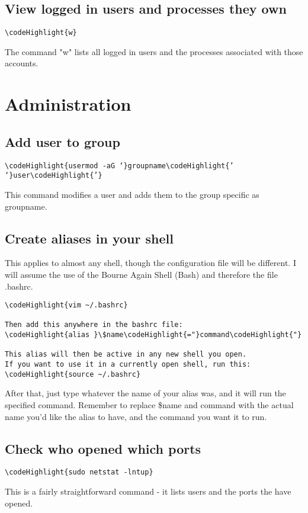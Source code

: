 \documentclass[12pt,a4paper]{article}
\begin{document}
\subsection{View logged in users and processes they own}
\begin{Verbatim}[commandchars=\\\{\}]
\codeHighlight{w}
\end{Verbatim}
The command "w" lists all logged in users and the processes associated with those accounts.

\section{Administration}
\label{Administration}

\subsection{Add user to group}
\begin{Verbatim}[commandchars=\\\{\}]
\codeHighlight{usermod -aG ‘}groupname\codeHighlight{’ ‘}user\codeHighlight{’}
\end{Verbatim}
This command modifies a user and adds them to the group specific as groupname.

\subsection{Create aliases in your shell}
\label{aliases}
This applies to almost any shell, though the configuration file will be different.  I will assume the use of the Bourne Again Shell (Bash) and therefore the file .bashrc.
\begin{Verbatim}[commandchars=\\\{\}]
\codeHighlight{vim ~/.bashrc}

Then add this anywhere in the bashrc file:
\codeHighlight{alias }\$name\codeHighlight{="}command\codeHighlight{"}

This alias will then be active in any new shell you open.
If you want to use it in a currently open shell, run this:
\codeHighlight{source ~/.bashrc}
\end{Verbatim}
After that, just type whatever the name of your alias was, and it will run the specified command.  Remember to replace \$name and command with the actual name you'd like the alias to have, and the command you want it to run.

\subsection{Check who opened which ports}
\begin{Verbatim}[commandchars=\\\{\}]
\codeHighlight{sudo netstat -lntup}
\end{Verbatim}
This is a fairly straightforward command - it lists users and the ports the have opened.
\end{document}
